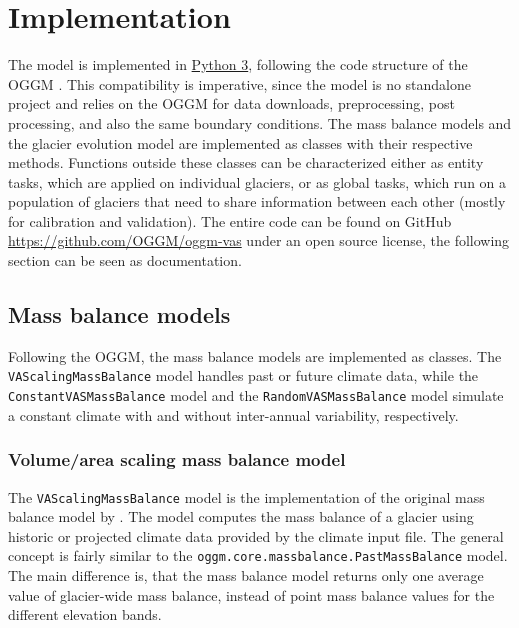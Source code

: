 

\section{Implementation} %
\label{sec:implementation}

    The \vas{} model is implemented in \href{https://www.python.org/}{Python 3}, following the code structure of the OGGM \citep{Maussion2019}. This compatibility is imperative, since the \vas{} model is no standalone project and relies on the OGGM for data downloads, preprocessing, post processing, and also the same boundary conditions. The mass balance models and the glacier evolution model are implemented as classes with their respective methods. Functions outside these classes can be characterized either as entity tasks, which are applied on individual glaciers, or as global tasks, which run on a population of glaciers that need to share information between each other (mostly for calibration and validation). The entire code can be found on GitHub \url{https://github.com/OGGM/oggm-vas} under an open source license, the following section can be seen as documentation.

    \subsection{Mass balance models} %
    \label{sub:mass_balance_models_implementation}

        Following the OGGM, the mass balance models are implemented as classes. The \lstinline`VAScalingMassBalance` model handles past or future climate data, while the \lstinline`ConstantVASMassBalance` model and the \lstinline`RandomVASMassBalance` model simulate a constant climate with and without inter-annual variability, respectively.

        \subsubsection{Volume/area scaling mass balance model} %
        \label{ssub:volume_area_scaling_mass_balance_model_implementation}

            The \lstinline`VAScalingMassBalance` model is the implementation of the original mass balance model by \citet{Marzeion2012b}. The model computes the mass balance of a glacier using historic or projected climate data provided by the climate input file. The general concept is fairly similar to the \lstinline`oggm.core.massbalance.PastMassBalance` model. The main difference is, that the \vas{} mass balance model returns only one average value of glacier-wide mass balance, instead of point mass balance values for the different elevation bands.

